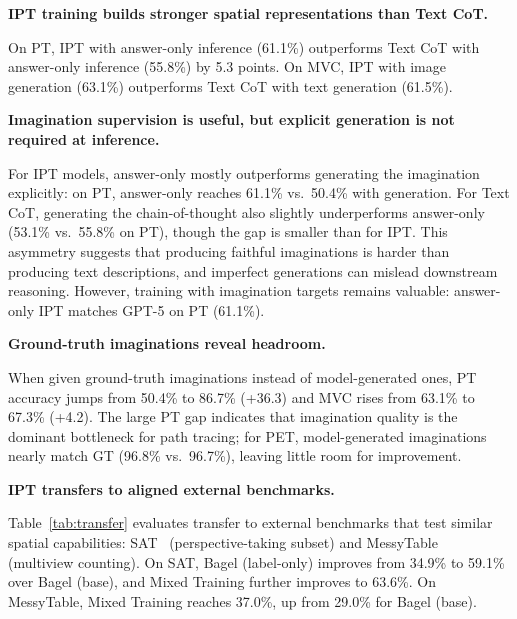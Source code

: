 \begin{takeawayblock}
    \textbf{IPT training builds stronger spatial representations than Text CoT.}
\end{takeawayblock}
On PT, IPT with answer-only inference (61.1\%) outperforms Text CoT with answer-only inference (55.8\%) by 5.3 points.
On MVC, IPT with image generation (63.1\%) outperforms Text CoT with text generation (61.5\%).

\begin{takeawayblock}
    \textbf{Imagination supervision is useful, but explicit generation is not required at inference.}
\end{takeawayblock}
For IPT models, answer-only mostly outperforms generating the imagination explicitly: on PT, answer-only reaches 61.1\% vs.\ 50.4\% with generation.
For Text CoT, generating the chain-of-thought also slightly underperforms answer-only (53.1\% vs.\ 55.8\% on PT), though the gap is smaller than for IPT.
This asymmetry suggests that producing faithful imaginations is harder than producing text descriptions, and imperfect generations can mislead downstream reasoning. However, training with imagination targets remains valuable: answer-only IPT matches GPT-5 on PT (61.1\%).

\begin{takeawayblock}
    \textbf{Ground-truth imaginations reveal headroom.}
\end{takeawayblock}
When given ground-truth imaginations instead of model-generated ones, PT accuracy jumps from 50.4\% to 86.7\% (+36.3) and MVC rises from 63.1\% to 67.3\% (+4.2).
The large PT gap indicates that imagination quality is the dominant bottleneck for path tracing; for PET, model-generated imaginations nearly match GT (96.8\% vs.\ 96.7\%), leaving little room for improvement.



\begin{takeawayblock}
    \textbf{IPT transfers to aligned external benchmarks.}
\end{takeawayblock}
Table~\ref{tab:transfer} evaluates transfer to external benchmarks that test similar spatial capabilities: SAT~\cite{ray2025satdynamicspatialaptitude} (perspective-taking subset) and MessyTable~\cite{cai2020messytable} (multiview counting).
On SAT, Bagel (label-only) improves from 34.9\% to 59.1\% over Bagel (base), and Mixed Training further improves to 63.6\%.
On MessyTable, Mixed Training reaches 37.0\%, up from 29.0\% for Bagel (base).

